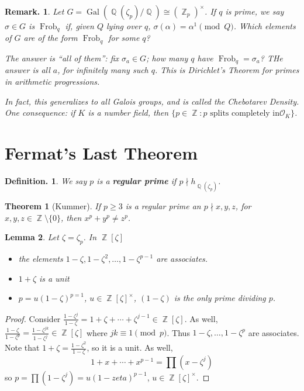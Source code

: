 \documentclass[11pt, a4paper]{memoir}
\DeclareMathOperator{\Q}{{\mathbb{Q}}}
\DeclareMathOperator{\Z}{{\mathbb{Z}}}
\theoremstyle{change}
\newtheorem{theorem}{Theorem}[section]
\newtheorem{lemma}[theorem]{Lemma}
\theoremstyle{plain}
\theoremstyle{nonumberplain}
\newtheorem{definition}{Definition.}
\newtheorem{remark}{Remark.}
\newtheorem{proof}{Proof}
\DeclareMathOperator{\Gal}{Gal}
\DeclareMathOperator{\Frob}{Frob}
\begin{document}
\begin{remark}
    Let $G=\Gal(\Q(\zeta_p)/\Q)\cong(\Z_p)^\times$.
    If $q$ is prime, we say $\sigma\in G$ is $\Frob_q$ if, given $Q$ lying over $q$, $\sigma(\alpha)=\alpha^1\pmod{Q}$.
    Which elements of $G$ are of the form $\Frob_q$ for some $q$?

    The answer is ``all of them'': fix $\sigma_a\in G$; how many $q$ have $\Frob_q=\sigma_a$?
    THe answer is all $a$, for infinitely many such $q$.
    This is Dirichlet's Theorem for primes in arithmetic progressions.

    In fact, this generalizes to all Galois groups, and is called the Chebotarev Density.
    One consequence: if $K$ is a number field, then $\{p\in\Z:p\text{ splits completely in}\mathcal{O}_K\}$.
\end{remark}
\section{Fermat's Last Theorem}
\begin{definition}
    We say $p$ is a \textbf{regular prime} if $p\nmid h_{\Q(\zeta_p)}$.
\end{definition}
\begin{theorem}[Kummer]
    If $p\geq 3$ is a regular prime an $p\nmid x,y,z$, for $x,y,z\in\Z\setminus\{0\}$, then $x^p+y^p\neq z^p$.
\end{theorem}
\begin{lemma}
    Let $\zeta=\zeta_p$.
    In $\Z[\zeta]$
    \begin{itemize}[nl]
        \item the elements $1-\zeta,1-\zeta^2,\ldots,1-\zeta^{p-1}$ are associates.
        \item $1+\zeta$ is a unit
        \item $p=u(1-\zeta)^{p=1}$, $u\in\Z[\zeta]^\times$, $(1-\zeta)$ is the only prime dividing $p$.
    \end{itemize}
\end{lemma}
\begin{proof}
    Consider $\frac{1-\zeta^j}{1-\zeta}=1+\zeta+\cdots+\zeta^{j-1}\in\Z[\zeta]$.
    As well, $\frac{1-\zeta}{1-\zeta^p}=\frac{1-\zeta^{jk}}{1-\zeta^j}\in\Z[\zeta]$ where $jk\equiv 1\pmod{p}$.
    Thus $1-\zeta,\ldots,1-\zeta^p$ are associates.
    Note that $1+\zeta=\frac{1-\zeta^2}{1-\zeta}$, so it is a unit.
    As well,
    \begin{equation*}
        1+x+\cdots+x^{p-1}=\prod(x-\zeta^j)
    \end{equation*}
    so $p=\prod(1-\zeta^j)=u(1-zeta)^{p-1}$, $u\in\Z[\zeta]^\times$.
\end{proof}
\end{document}
